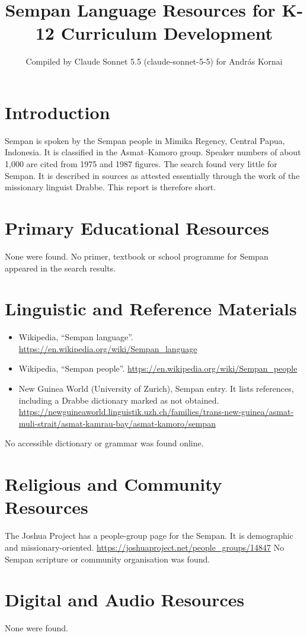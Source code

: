 \documentclass[12pt]{article}
\title{Sempan Language Resources for K-12 Curriculum Development}
\author{Compiled by Claude Sonnet 5.5 (claude-sonnet-5-5) for Andr\'as Kornai}
\date{}
\begin{document}
\maketitle

\section{Introduction}
Sempan is spoken by the Sempan people in Mimika Regency, Central Papua, Indonesia. It is classified in the Asmat--Kamoro group. Speaker numbers of about 1,000 are cited from 1975 and 1987 figures. The search found very little for Sempan. It is described in sources as attested essentially through the work of the missionary linguist Drabbe. This report is therefore short.

\section{Primary Educational Resources}
None were found. No primer, textbook or school programme for Sempan appeared in the search results.

\section{Linguistic and Reference Materials}
\begin{itemize}
\item Wikipedia, ``Sempan language''. \url{https://en.wikipedia.org/wiki/Sempan_language}
\item Wikipedia, ``Sempan people''. \url{https://en.wikipedia.org/wiki/Sempan_people}
\item New Guinea World (University of Zurich), Sempan entry. It lists references, including a Drabbe dictionary marked as not obtained. \url{https://newguineaworld.linguistik.uzh.ch/families/trans-new-guinea/asmat-muli-strait/asmat-kamrau-bay/asmat-kamoro/sempan}
\end{itemize}
No accessible dictionary or grammar was found online.

\section{Religious and Community Resources}
The Joshua Project has a people-group page for the Sempan. It is demographic and missionary-oriented. \url{https://joshuaproject.net/people_groups/14847}
No Sempan scripture or community organisation was found.

\section{Digital and Audio Resources}
None were found.
\end{document}
